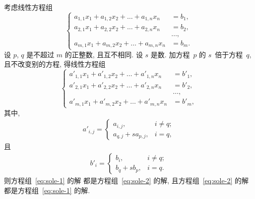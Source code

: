 \documentclass[../libro.tex]{subfiles}
\begin{document}
\begin{theorem}
    考虑线性方程组
    \begin{equation}
        \left\{ %
        \begin{aligned}
            a_{1,1} x_1 + a_{1,2} x_2 + \dots + a_{1,n} x_n & = b_1, \\
            a_{2,1} x_1 + a_{2,2} x_2 + \dots + a_{2,n} x_n & = b_2, \\
            & \dots, \\
            a_{m,1} x_1 + a_{m,2} x_2 + \dots + a_{m,n} x_n & = b_m.
        \end{aligned}
        \right. %
        \label{eq:sole-1}
    \end{equation}
    设 \(p\), \(q\) 是不超过 \(m\) 的正整数,
    且互不相同.
    设 \(s\) 是数.
    加方程~\(p\) 的 \(s\)~倍于方程~\(q\),
    且不改变别的方程,
    得线性方程组
    \begin{equation}
        \left\{ %
        \begin{aligned}
            a'_{1,1} x_1 + a'_{1,2} x_2 + \dots + a'_{1,n} x_n & = b'_1, \\
            a'_{2,1} x_1 + a'_{2,2} x_2 + \dots + a'_{2,n} x_n & = b'_2, \\
            & \dots, \\
            a'_{m,1} x_1 + a'_{m,2} x_2 + \dots + a'_{m,n} x_n & = b'_m,
        \end{aligned}
        \right. %
        \label{eq:sole-2}
    \end{equation}
    其中,
    \begin{align*}
        a'_{i,j} =
        \begin{cases}
            a_{i,j},             & i \neq q; \\
            a_{q,j} + s a_{p,j}, & i = q,
        \end{cases}
    \end{align*}
    且
    \begin{align*}
        b'_i =
        \begin{cases}
            b_i,         & i \neq q; \\
            b_q + s b_p, & i = q.
        \end{cases}
    \end{align*}
    则方程组~\eqref{eq:sole-1} 的解%
    都是方程组~\eqref{eq:sole-2} 的解,
    且方程组~\eqref{eq:sole-2} 的解%
    都是方程组~\eqref{eq:sole-1} 的解.
\end{theorem}
\end{document}
